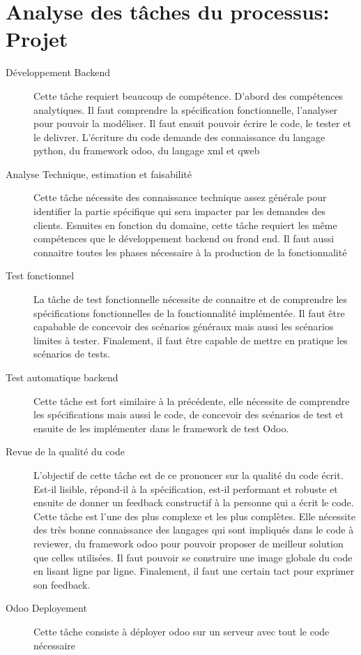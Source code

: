 \section{Analyse des tâches du processus: Projet}
\begin{description}
    \item[Développement Backend]
    Cette tâche requiert beaucoup de compétence. D'abord des compétences analytiques. Il faut comprendre la spécification fonctionnelle, l'analyser pour pouvoir la modéliser. Il faut ensuit pouvoir écrire le code, le tester et le delivrer. 
    L'écriture du code demande des connaissance du langage python, du framework odoo, du langage xml et qweb
    \item[Analyse Technique, estimation et faisabilité]
    Cette tâche nécessite des connaissance technique assez générale pour identifier la partie spécifique qui sera impacter par les demandes des clients. Esnuites en fonction du domaine, cette tâche requiert les même compétences que le développement backend ou frond end. Il faut aussi connaitre toutes les phases nécessaire à la production de la fonctionnalité 
    \item[Test fonctionnel]
    La tâche de test fonctionnelle nécessite de connaitre et de comprendre les spécifications fonctionnelles de la fonctionnalité implémentée. Il faut être capabable de concevoir des scénarios généraux mais aussi les scénarios limites à tester. Finalement, il faut être capable de mettre en pratique les scénarios de tests. 
    \item[Test automatique backend]
    Cette tâche est fort similaire à la précédente, elle nécessite de comprendre les spécifications mais aussi le code, de concevoir des scénarios de test et ensuite de les implémenter dans le framework de test Odoo. 
    \item[Revue de la qualité du code]
    L'objectif de cette tâche est de ce prononcer sur la qualité du code écrit. Est-il lisible, répond-il à la spécification, est-il performant et robuste et ensuite de donner un feedback constructif à la personne qui a écrit le code. Cette tâche est l'une des plus complexe et les plus complètes. Elle nécessite des très bonne connaissance des langages qui sont impliqués dans le code à reviewer, du framework odoo pour pouvoir proposer de meilleur solution que celles utilisées. Il faut pouvoir se construire une image globale du code en lisant ligne par ligne. Finalement, il faut une certain tact pour exprimer son feedback. 
    \item[Odoo Deployement] Cette tâche consiste à déployer odoo sur un serveur avec tout le code nécessaire 
\end{description}

